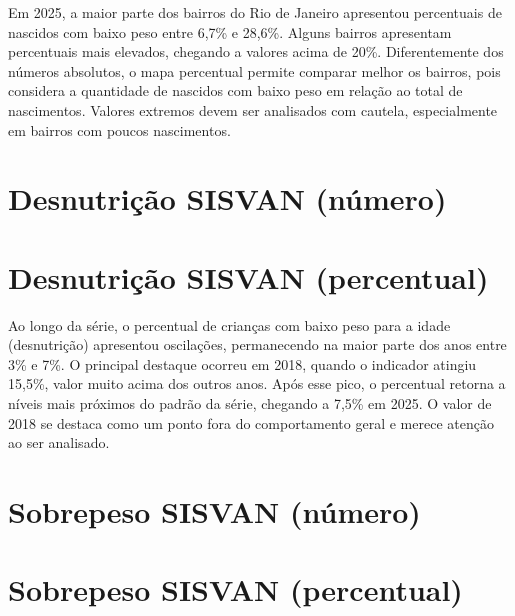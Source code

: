 Em 2025, a maior parte dos bairros do Rio de Janeiro apresentou percentuais de nascidos com baixo peso entre 6,7\% e 28,6\%. Alguns bairros apresentam percentuais mais elevados, chegando a valores acima de 20\%. Diferentemente dos números absolutos, o mapa percentual permite comparar melhor os bairros, pois considera a quantidade de nascidos com baixo peso em relação ao total de nascimentos. Valores extremos devem ser analisados com cautela, especialmente em bairros com poucos nascimentos.


\section{Desnutrição SISVAN (número)}


\section{Desnutrição SISVAN (percentual)}


Ao longo da série, o percentual de crianças com baixo peso para a idade (desnutrição) apresentou oscilações, permanecendo na maior parte dos anos entre 3\% e 7\%. O principal destaque ocorreu em 2018, quando o indicador atingiu 15,5\%, valor muito acima dos outros anos. Após esse pico, o percentual retorna a níveis mais próximos do padrão da série, chegando a 7,5\% em 2025. O valor de 2018 se destaca como um ponto fora do comportamento geral e merece atenção ao ser analisado.


\section{Sobrepeso SISVAN (número)}


\section{Sobrepeso SISVAN (percentual)}

